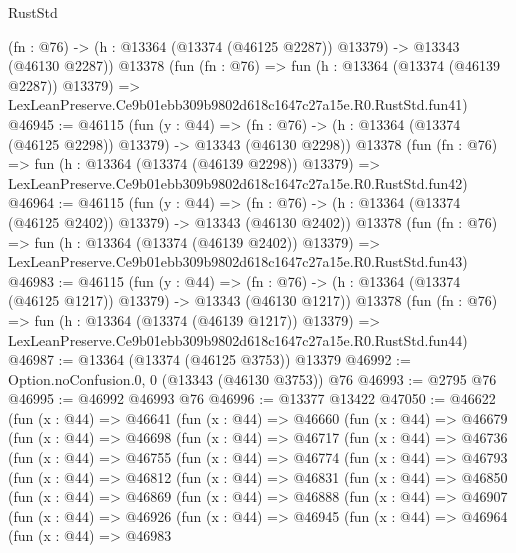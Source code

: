 \begin{lexlean}{RustStd}
\begin{coremodule}
    (fn : @76) -> (h : @13364 (@13374 (@46125 @2287)) @13379) -> @13343 (@46130 @2287))
    @13378
    (fun (fn : @76) =>
    fun (h : @13364 (@13374 (@46139 @2287)) @13379) =>
    LexLeanPreserve.Ce9b01ebb309b9802d618c1647c27a15e.R0.RustStd.fun41)
@46945 := @46115
    (fun (y : @44) =>
    (fn : @76) -> (h : @13364 (@13374 (@46125 @2298)) @13379) -> @13343 (@46130 @2298))
    @13378
    (fun (fn : @76) =>
    fun (h : @13364 (@13374 (@46139 @2298)) @13379) =>
    LexLeanPreserve.Ce9b01ebb309b9802d618c1647c27a15e.R0.RustStd.fun42)
@46964 := @46115
    (fun (y : @44) =>
    (fn : @76) -> (h : @13364 (@13374 (@46125 @2402)) @13379) -> @13343 (@46130 @2402))
    @13378
    (fun (fn : @76) =>
    fun (h : @13364 (@13374 (@46139 @2402)) @13379) =>
    LexLeanPreserve.Ce9b01ebb309b9802d618c1647c27a15e.R0.RustStd.fun43)
@46983 := @46115
    (fun (y : @44) =>
    (fn : @76) -> (h : @13364 (@13374 (@46125 @1217)) @13379) -> @13343 (@46130 @1217))
    @13378
    (fun (fn : @76) =>
    fun (h : @13364 (@13374 (@46139 @1217)) @13379) =>
    LexLeanPreserve.Ce9b01ebb309b9802d618c1647c27a15e.R0.RustStd.fun44)
@46987 := @13364 (@13374 (@46125 @3753)) @13379
@46992 := Option.noConfusion.{0, 0} (@13343 (@46130 @3753)) @76
@46993 := @2795 @76
@46995 := @46992 @46993 @76
@46996 := @13377 @13422
@47050 := @46622
    (fun (x : @44) =>
    @46641
      (fun (x : @44) =>
      @46660
        (fun (x : @44) =>
        @46679
          (fun (x : @44) =>
          @46698
            (fun (x : @44) =>
            @46717
              (fun (x : @44) =>
              @46736
                (fun (x : @44) =>
                @46755
                  (fun (x : @44) =>
                  @46774
                    (fun (x : @44) =>
                    @46793
                      (fun (x : @44) =>
                      @46812
                        (fun (x : @44) =>
                        @46831
                          (fun (x : @44) =>
                          @46850
                            (fun (x : @44) =>
                            @46869
                              (fun (x : @44) =>
                              @46888
                                (fun (x : @44) =>
                                @46907
                                  (fun (x : @44) =>
                                  @46926
                                    (fun (x : @44) =>
                                    @46945
                                      (fun (x : @44) =>
                                      @46964
                                        (fun (x : @44) =>
                                        @46983

\end{coremodule}
\end{lexlean}
